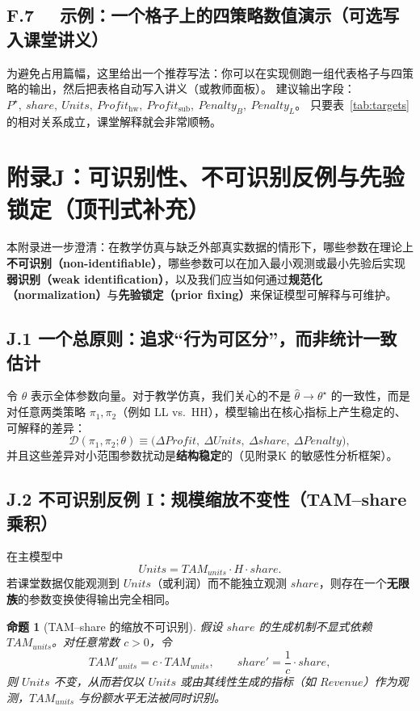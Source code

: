 \documentclass[UTF8,12pt]{ctexart}
\newtheorem{proposition}{命题}
\begin{document}
\subsection*{F.7 \ \ 示例：一个格子上的四策略数值演示（可选写入课堂讲义）}
为避免占用篇幅，这里给出一个推荐写法：你可以在实现侧跑一组代表格子与四策略的输出，然后把表格自动写入讲义（或教师面板）。
建议输出字段：$P^\star,\ share,\ Units,\ Profit_{\text{hw}},\ Profit_{\text{sub}},\ Penalty_B,\ Penalty_L$。
只要表~\ref{tab:targets} 的相对关系成立，课堂解释就会非常顺畅。



\section{附录J：可识别性、不可识别反例与先验锁定（顶刊式补充）}\label{app:J}

本附录进一步澄清：在教学仿真与缺乏外部真实数据的情形下，哪些参数在理论上\textbf{不可识别（non-identifiable）}，哪些参数可以在加入最小观测或最小先验后实现\textbf{弱识别（weak identification）}，以及我们应当如何通过\textbf{规范化（normalization）}与\textbf{先验锁定（prior fixing）}来保证模型可解释与可维护。

\subsection{J.1 一个总原则：追求“行为可区分”，而非统计一致估计}
令 $\theta$ 表示全体参数向量。对于教学仿真，我们关心的不是 $\hat{\theta}\to\theta^\star$ 的一致性，而是对任意两类策略 $\pi_1,\pi_2$（例如 LL vs.\ HH），模型输出在核心指标上产生稳定的、可解释的差异：
\[
\mathcal{D}(\pi_1,\pi_2;\theta) \equiv 
\big(\Delta Profit,\ \Delta Units,\ \Delta share,\ \Delta Penalty\big),
\]
并且这些差异对小范围参数扰动是\textbf{结构稳定}的（见附录K 的敏感性分析框架）。

\subsection{J.2 不可识别反例 I：规模缩放不变性（TAM--share 乘积）}
在主模型中
\[
Units = TAM_{units}\cdot H \cdot share.
\]
若课堂数据仅能观测到 $Units$（或利润）而不能独立观测 $share$，则存在一个\textbf{无限族}的参数变换使得输出完全相同。

\begin{proposition}[TAM--share 的缩放不可识别]\label{prop:tam_share}
假设 $share$ 的生成机制不显式依赖 $TAM_{units}$。对任意常数 $c>0$，令
\[
TAM'_{units}=c\cdot TAM_{units},\qquad share'=\frac{1}{c}\cdot share,
\]
则 $Units$ 不变，从而若仅以 $Units$ 或由其线性生成的指标（如 $Revenue$）作为观测，$TAM_{units}$ 与份额水平无法被同时识别。
\end{proposition}
\end{document}
